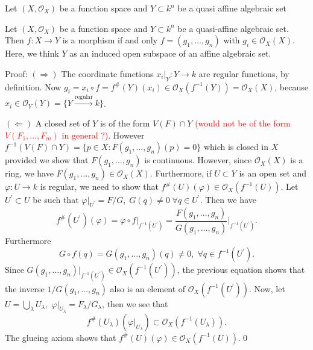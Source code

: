 \begin{dang}
    \begin{lemma}
        Let $(X,\mathcal{O}_X)$ be a function space and $Y\subset k^n$ be a quasi affine algebraic set
    \end{lemma}
\end{dang}


\begin{dang}
    \begin{lemma}\label{lemma: coordinate criteria to a map be a morphism of function spaces}
        Let $(X,\mathcal{O}_X)$ be a function space and $Y\subset k^n$ be a quasi-affine algebraic set. 
        Then $f:X\to Y$ is a morphism if and only $f=(g_1,\dots,g_n)$ with $g_i\in\mathcal{O}_X(X)$. Here, 
        we think $Y$ as an induced open subspace of an affine algebraic set.
    \end{lemma}
\end{dang}
Proof: $(\Rightarrow)$ The coordinate functions $x_i|_Y:Y\to k$ are regular functions, by definition. Now 
$g_i = x_i\circ f = f^\#(Y)(x_i)\in\mathcal{O}_X(f^{-1}(Y))=\mathcal{O}_X(X)$, because 
$x_i\in\mathcal{O}_Y(Y)=\{Y\overset{\text{regular}}{\to}k\}$.\par 
$(\Leftarrow)$ A closed set of $Y$ is of the form $V(F)\cap Y$ 
\textcolor{red}{(would not be of the form $V(F_1,\dots, F_m)$ in general ?)}. However
$f^{-1}(V(F)\cap Y)=\{p\in X: F(g_1,\dots, g_n)(p)=0\}$ which is closed in $X$ provided we show that 
$F(g_1,\dots, g_n)$ is continuous. However, since $\mathcal{O}_X(X)$ is a ring, we have $F(g_1,\dots, g_n)\in\mathcal{O}_X(X)$. 
Furthermore, if $U\subset Y$ is an open set and $\varphi:U\to k$ is regular, we need to show that 
$f^{\#}(U)(\varphi)\in\mathcal{O}_X(f^{-1}(U))$. Let $U^\prime\subset U$ be such that 
$\varphi|_{U^\prime}=F/G,\;G(q)\neq0\;\forall q\in U^\prime$. Then we have 
\begin{equation}
    f^\#(U^\prime)(\varphi)=\varphi\circ f|_{f^{-1}(U^\prime)} = 
    \frac{F(g_1,\dots, g_n)}{G(g_1,\dots, g_n)}\bigg|_{f^{-1}(U^\prime)}.
\end{equation}
Furthermore 
\begin{equation}
    G\circ f(q) = G(g_1,\dots, g_n)(q) \neq 0,\;\forall q\in f^{-1}(U^\prime).
\end{equation}
Since $G(g_1,\dots,g_n)|_{f^{-1}(U^\prime)}\in\mathcal{O}_X(f^{-1}(U^\prime))$, the previous equation 
shows that the inverse $1/G(g_1,\dots,g_n)$ also is an element of $\mathcal{O}_X(f^{-1}(U^\prime))$. Now, let 
$U=\bigcup_\lambda U_\lambda,\;\varphi|_{U_\lambda}=F_\lambda/G_\lambda$, then we see that 
\begin{equation}
    f^\#(U_\lambda)(\varphi|_{U_\lambda})\subset \mathcal{O}_X(f^{-1}(U_\lambda)).
\end{equation}
The glueing axiom shows that $f^\#(U)(\varphi)\in\mathcal{O}_X(f^{-1}(U))$.\qed


